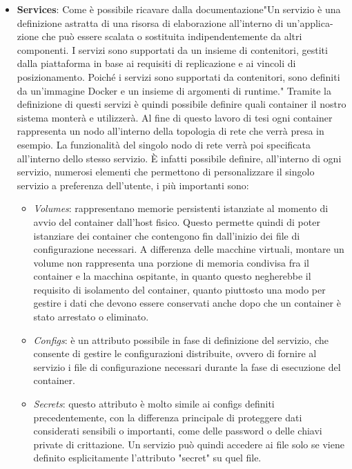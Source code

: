 \begin{itemize}
    \item \textbf{Services}: Come è possibile ricavare dalla documentazione\cite{composeservices}"Un servizio è una definizione astratta di una risorsa di elaborazione all'interno di un'applica-zione che può essere scalata o sostituita indipendentemente da altri componenti. 
    I servizi sono supportati da un insieme di contenitori, gestiti dalla piattaforma in base ai requisiti di replicazione e ai vincoli di posizionamento. Poiché i servizi sono supportati da contenitori, sono definiti da un'immagine Docker e un insieme di argomenti di runtime."
    Tramite la definizione di questi servizi è quindi possibile definire quali container il nostro sistema monterà e utilizzerà. Al fine di questo lavoro di tesi ogni container rappresenta un nodo all'interno della topologia di rete che verrà presa in esempio. La funzionalità del
    singolo nodo di rete verrà poi specificata all'interno dello stesso servizio. È infatti possibile definire, all'interno di ogni servizio, numerosi elementi che permettono di personalizzare il singolo servizio a preferenza dell'utente, i più importanti sono:\\

    \begin{itemize}
        \item \textit{Volumes}: rappresentano memorie persistenti istanziate al momento di avvio del container dall'host fisico. Questo permette quindi di poter istanziare dei container che contengono fin dall'inizio dei file di configurazione necessari. A differenza delle macchine virtuali, montare un volume
            non rappresenta una porzione di memoria condivisa fra il container e la macchina ospitante, in quanto questo negherebbe il requisito di isolamento del container, quanto piuttosto una modo per gestire i dati che devono essere conservati anche dopo che un container è stato arrestato o eliminato.
        \item \textit{Configs}: è un attributo possibile in fase di definizione del servizio, che consente di gestire le configurazioni distribuite, ovvero di fornire al servizio i file di configurazione necessari durante la fase di esecuzione del container.  
        \item \textit{Secrets}: questo attributo è molto simile ai configs definiti precedentemente, con la differenza principale di proteggere dati considerati sensibili o importanti, come delle password o delle chiavi private di crittazione. Un servizio può quindi accedere ai file solo se viene definito esplicitamente
            l'attributo "secret" su quel file.
    \end{itemize}


\end{itemize}
